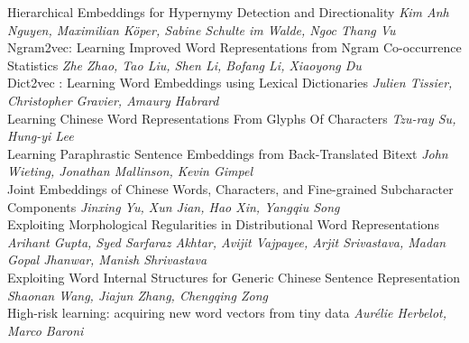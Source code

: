 \documentclass{book}
\begin{document}
    
    \noindent	Hierarchical Embeddings for Hypernymy Detection and Directionality \newline 
    {\itshape Kim Anh Nguyen, Maximilian Köper, Sabine Schulte im Walde, Ngoc Thang Vu} \\
    
    \noindent	Ngram2vec: Learning Improved Word Representations from Ngram Co-occurrence Statistics \newline 
    {\itshape Zhe Zhao, Tao Liu, Shen Li, Bofang Li, Xiaoyong Du} \\
    
    \noindent	Dict2vec : Learning Word Embeddings using Lexical Dictionaries \newline 
    {\itshape Julien Tissier, Christopher Gravier, Amaury Habrard} \\
    
    \noindent	Learning Chinese Word Representations From Glyphs Of Characters \newline 
    {\itshape Tzu-ray Su, Hung-yi Lee} \\
    
    \noindent	Learning Paraphrastic Sentence Embeddings from Back-Translated Bitext \newline 
    {\itshape John Wieting, Jonathan Mallinson, Kevin Gimpel} \\
    
    \noindent	Joint Embeddings of Chinese Words, Characters, and Fine-grained Subcharacter Components \newline 
    {\itshape Jinxing Yu, Xun Jian, Hao Xin, Yangqiu Song} \\
    
    \noindent	Exploiting Morphological Regularities in Distributional Word Representations \newline 
    {\itshape Arihant Gupta, Syed Sarfaraz Akhtar, Avijit Vajpayee, Arjit Srivastava, Madan Gopal Jhanwar, Manish Shrivastava} \\
    
    \noindent	Exploiting Word Internal Structures for Generic Chinese Sentence Representation \newline 
    {\itshape Shaonan Wang, Jiajun Zhang, Chengqing Zong} \\
    
    \noindent	High-risk learning: acquiring new word vectors from tiny data \newline 
    {\itshape Aurélie Herbelot, Marco Baroni} \\
    
\end{document}
